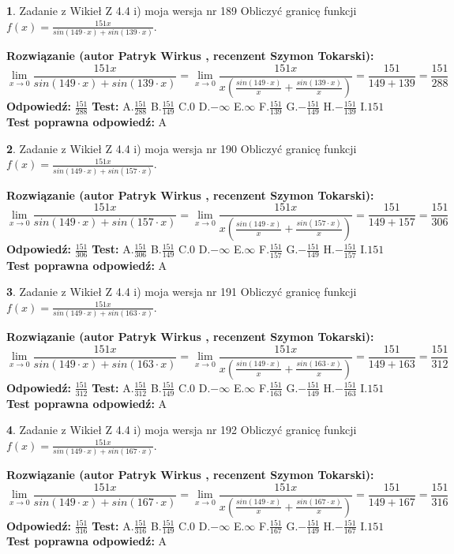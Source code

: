 \documentclass[12pt, a4paper]{article}
\theoremstyle{definition} %
\newtheorem{zad}{}
\newcommand{\zadStart}[1]{\begin{zad}#1\newline}
\newcommand{\zadStop}{\end{zad}}
\newcommand{\rozwStart}[2]{\noindent \textbf{Rozwiązanie (autor #1 , recenzent #2): }\newline}
\newcommand{\rozwStop}{\newline}
\newcommand{\odpStart}{\noindent \textbf{Odpowiedź:}\newline}
\newcommand{\odpStop}{\newline}
\newcommand{\testStart}{\noindent \textbf{Test:}\newline}
\newcommand{\testStop}{\newline}
\newcommand{\kluczStart}{\noindent \textbf{Test poprawna odpowiedź:}\newline}
\newcommand{\kluczStop}{\newline}
\begin{document}
\zadStart{Zadanie z Wikieł Z 4.4 i) moja wersja nr 189}
Obliczyć granicę funkcji $f(x)=\frac{151x}{sin(149\cdot x) +sin(139\cdot x)}$.
\zadStop
\rozwStart{Patryk Wirkus}{Szymon Tokarski}
$$\lim\limits_{x\to 0}\frac{151x}{sin(149\cdot x) +sin(139\cdot x)}=\lim\limits_{x\to 0}\frac{151x}{x(\frac{sin(149\cdot x)}{x}+\frac{sin(139\cdot x)}{x})}=\frac{151}{149+139} = \frac{151}{288}$$
\rozwStop
\odpStart
$\frac{151}{288}$
\odpStop
\testStart
A.$\frac{151}{288}$
B.$\frac{151}{149}$
C.$0$
D.$-\infty$
E.$\infty$
F.$\frac{151}{139}$
G.$-\frac{151}{149}$
H.$-\frac{151}{139}$
I.$151$
\testStop
\kluczStart
A
\kluczStop



\zadStart{Zadanie z Wikieł Z 4.4 i) moja wersja nr 190}
Obliczyć granicę funkcji $f(x)=\frac{151x}{sin(149\cdot x) +sin(157\cdot x)}$.
\zadStop
\rozwStart{Patryk Wirkus}{Szymon Tokarski}
$$\lim\limits_{x\to 0}\frac{151x}{sin(149\cdot x) +sin(157\cdot x)}=\lim\limits_{x\to 0}\frac{151x}{x(\frac{sin(149\cdot x)}{x}+\frac{sin(157\cdot x)}{x})}=\frac{151}{149+157} = \frac{151}{306}$$
\rozwStop
\odpStart
$\frac{151}{306}$
\odpStop
\testStart
A.$\frac{151}{306}$
B.$\frac{151}{149}$
C.$0$
D.$-\infty$
E.$\infty$
F.$\frac{151}{157}$
G.$-\frac{151}{149}$
H.$-\frac{151}{157}$
I.$151$
\testStop
\kluczStart
A
\kluczStop



\zadStart{Zadanie z Wikieł Z 4.4 i) moja wersja nr 191}
Obliczyć granicę funkcji $f(x)=\frac{151x}{sin(149\cdot x) +sin(163\cdot x)}$.
\zadStop
\rozwStart{Patryk Wirkus}{Szymon Tokarski}
$$\lim\limits_{x\to 0}\frac{151x}{sin(149\cdot x) +sin(163\cdot x)}=\lim\limits_{x\to 0}\frac{151x}{x(\frac{sin(149\cdot x)}{x}+\frac{sin(163\cdot x)}{x})}=\frac{151}{149+163} = \frac{151}{312}$$
\rozwStop
\odpStart
$\frac{151}{312}$
\odpStop
\testStart
A.$\frac{151}{312}$
B.$\frac{151}{149}$
C.$0$
D.$-\infty$
E.$\infty$
F.$\frac{151}{163}$
G.$-\frac{151}{149}$
H.$-\frac{151}{163}$
I.$151$
\testStop
\kluczStart
A
\kluczStop



\zadStart{Zadanie z Wikieł Z 4.4 i) moja wersja nr 192}
Obliczyć granicę funkcji $f(x)=\frac{151x}{sin(149\cdot x) +sin(167\cdot x)}$.
\zadStop
\rozwStart{Patryk Wirkus}{Szymon Tokarski}
$$\lim\limits_{x\to 0}\frac{151x}{sin(149\cdot x) +sin(167\cdot x)}=\lim\limits_{x\to 0}\frac{151x}{x(\frac{sin(149\cdot x)}{x}+\frac{sin(167\cdot x)}{x})}=\frac{151}{149+167} = \frac{151}{316}$$
\rozwStop
\odpStart
$\frac{151}{316}$
\odpStop
\testStart
A.$\frac{151}{316}$
B.$\frac{151}{149}$
C.$0$
D.$-\infty$
E.$\infty$
F.$\frac{151}{167}$
G.$-\frac{151}{149}$
H.$-\frac{151}{167}$
I.$151$
\testStop
\kluczStart
A
\kluczStop
\end{document}
